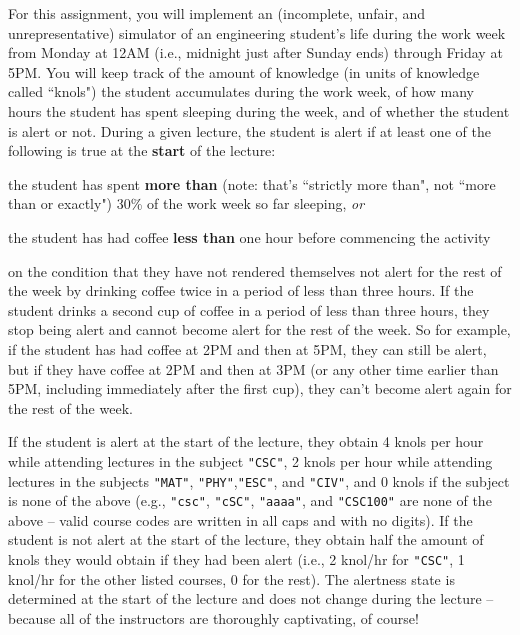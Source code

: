 \documentclass[11pt]{article}
\let\etaremune\enumerate
\let\etaremunedne\endenumerate
\renewenvironment{enumerate}
   {\etaremune
    \setlength{\topsep}{.25ex plus .125ex minus .1825ex}%
    \setlength{\itemsep}{\topsep}\setlength{\parsep}{0ex}%
    \setlength{\leftmargin}{1.75em}\setlength{\labelsep}{.5em}%
    \setlength{\labelwidth}{1.75em}\ignorespaces}
   {\etaremunedne}
\begin{document}
\newpage
{}

\noindent
For this assignment, you will implement an (incomplete, unfair, and unrepresentative) simulator of an engineering student's life during the work week from Monday at 12AM (i.e., midnight just after Sunday ends) through Friday at 5PM. You will keep track of the amount of knowledge (in units of knowledge called
``knols") the student accumulates during the work week, of how many hours the student has spent sleeping during the week, and of whether the student is alert or not. During a given lecture, the student is alert if at least one of the following is true at the \textbf{start} of the lecture:
\begin{enumerate}
	\item the student has spent \textbf{more than} (note: that’s ``strictly more than", not ``more than or exactly") 30\% of the work week so far sleeping, \textit{or}
	
	\item the student has had coffee \textbf{less than} one hour before commencing the activity
\end{enumerate}


on the condition that they have not rendered themselves not alert for the rest of the week by drinking coffee twice in a period of less than three hours. If the student drinks a second cup of coffee in a period of less than three hours, they stop being alert and cannot become alert for the rest of the week. So for
example, if the student has had coffee at 2PM and then at 5PM, they can still be alert, but if they have
coffee at 2PM and then at 3PM (or any other time earlier than 5PM, including immediately after the first
cup), they can’t become alert again for the rest of the week.

If the student is alert at the start of the lecture, they obtain 4 knols per hour while attending
lectures in the subject \texttt{"CSC"}, 2 knols per hour while attending lectures in the subjects \texttt{"MAT"}, \texttt{"PHY"},\texttt{"ESC"}, and \texttt{"CIV"}, and 0 knols if the subject is none of the above (e.g., \texttt{"csc"}, \texttt{"cSC"}, \texttt{"aaaa"},
and \texttt{"CSC100"} are none of the above -- valid course codes are written in all caps and with no digits). If the
student is not alert at the start of the lecture, they obtain half the amount of knols they would obtain if
they had been alert (i.e., 2 knol/hr for \texttt{"CSC"}, 1 knol/hr for the other listed courses, 0 for the rest). The
alertness state is determined at the start of the lecture and does not change during the lecture -- because
all of the instructors are thoroughly captivating, of course!
\end{document}
